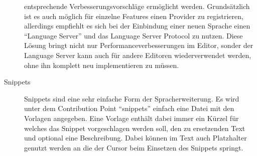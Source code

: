 \begin{description}
      entsprechende Verbesserungsvorschläge ermöglicht werden. Grundsätzlich ist es auch möglich für einzelne
      Features einen Provider zu registrieren, allerdings empfiehlt es sich bei der Einbindung einer neuen
      Sprache einen \enquote{Language Server} und das Language Server Protocol zu nutzen. Diese Lösung
      bringt nicht nur Performanceverbesserungen im Editor, sonder der Language Server kann auch für 
      andere Editoren wiederverwendet werden, ohne ihn komplett neu implementieren zu müssen.
    \item[Snippets] 
      Snippets sind eine sehr einfache Form der Spracherweiterung. Es wird unter dem Contribution Point
      \enquote{snippets} einfach eine Datei mit den Vorlagen angegeben. Eine Vorlage enthält dabei immer
      ein Kürzel für welches das Snippet vorgeschlagen werden soll, den zu ersetzenden Text und optional
      eine Beschreibung. Dabei können im Text auch Platzhalter genutzt werden an die der Cursor beim Einsetzen
      des Snippets springt.
  \end{description}
